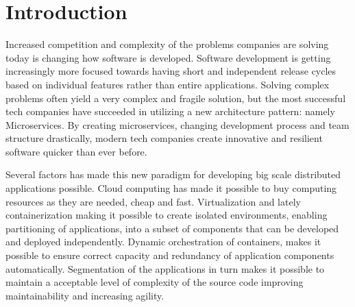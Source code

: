 \chapter{Introduction}
\label{ch:introduction}
Increased competition and complexity of the problems companies are solving today is changing how software is developed. Software development is getting increasingly more focused towards having short and independent release cycles based on individual features rather than entire applications. Solving complex problems often yield a very complex and fragile solution, but the most successful tech companies have succeeded in utilizing a new architecture pattern: namely Microservices. By creating microservices, changing development process and team structure drastically, modern tech companies create innovative and resilient software quicker than ever before.

Several factors has made this new paradigm for developing big scale distributed applications possible. Cloud computing has made it possible to buy computing resources as they are needed, cheap and fast. Virtualization and lately containerization making it possible to create isolated environments, enabling partitioning of applications, into a subset of components that can be developed and deployed independently. Dynamic orchestration of containers, makes it possible to ensure correct capacity and redundancy of application components automatically. Segmentation of the applications in turn makes it possible to maintain a acceptable level of complexity of the source code improving maintainability and increasing agility.


